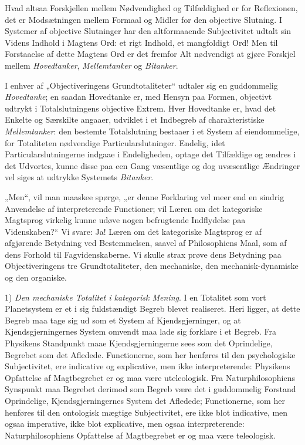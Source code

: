 \documentclass[12pt]{book}
\newcommand{\opage}[1]{\marginnote{\footnotesize\textit{[#1]}}}
\begin{document}
Hvad altsaa Forskjellen mellem Nødvendighed og Tilfældighed er for Reflexionen, det er Modsætningen mellem Formaal og Midler for den objective Slutning. I Systemer af objective Slutninger har den altformaaende Subjectivitet udtalt sin Videns Indhold i Magtens Ord: et rigt Indhold, et mangfoldigt Ord! Men til Forstaaelse af dette Magtens Ord er det fremfor Alt nødvendigt at gjøre Forskjel mellem \emph{Hovedtanker}, \emph{Mellemtanker} og \emph{Bitanker}.

I enhver af „Objectiveringens Grundtotaliteter“ udtaler sig en guddommelig \emph{Hovedtanke}; en saadan Hovedtanke er, med Hensyn paa Formen, objectivt udtrykt i Totalslutningens objective Extrem. Hver Hovedtanke er, hvad det Enkelte og Særskilte angaaer, udviklet i et Indbegreb af charakteristiske \emph{Mellemtanker}: den bestemte Totalslutning bestaaer i et System af eiendommelige, for Totaliteten nødvendige Particularslutninger. Endelig, idet Particularslutningerne indgaae i Endeligheden, optage det Tilfældige og ændres i det Udvortes, kunne disse
\opage{426}paa een Gang væsentlige og dog uvæsentlige Ændringer vel siges at udtrykke Systemets \emph{Bitanker}.

„Men“, vil man maaskee spørge, „er denne Forklaring vel meer end en sindrig Anvendelse af interpreterende Functioner; vil Læren om det kategoriske Magtsprog virkelig kunne udøve nogen befrugtende Indflydelse paa Videnskaben?“ Vi svare: Ja! Læren om det kategoriske Magtsprog er af afgjørende Betydning ved Bestemmelsen, saavel af Philosophiens Maal, som af dens Forhold til Fagvidenskaberne. Vi skulle strax prøve dens Betydning paa Objectiveringens tre Grundtotaliteter, den mechaniske, den mechanisk-dynamiske og den organiske.

1) \emph{Den mechaniske Totalitet i kategorisk Mening}. I en Totalitet som vort Planetsystem er et i sig fuldstændigt Begreb blevet realiseret. Heri ligger, at dette Begreb maa tage sig ud som et System af Kjendsgjerninger, og at Kjendsgjerningernes System omvendt maa lade sig forklare i et Begreb. Fra Physikens Standpunkt maae Kjendsgjerningerne sees som det Oprindelige, Begrebet som det Afledede. Functionerne, som her henføres til den psychologiske Subjectivitet, ere indicative og explicative, men ikke interpreterende: Physikens Opfattelse af Magtbegrebet er og maa være uteleologisk. Fra Naturphilosophiens Synspunkt maa Begrebet derimod som Begreb være det i guddommelig Forstand Oprindelige, Kjendsgjerningernes System det Afledede; Functionerne, som her henføres til den ontologisk mægtige Subjectivitet, ere ikke blot indicative, men ogsaa imperative, ikke blot explicative, men ogsaa interpreterende: Naturphilosophiens Opfattelse af Magtbegrebet er og maa være teleologisk.
\end{document}
